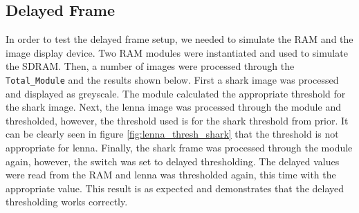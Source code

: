\documentclass[12pt]{article}
\begin{document}
  \subsection{Delayed Frame}
  In order to test the delayed frame setup, we needed to simulate the RAM and the image display device. Two RAM modules were instantiated and used to simulate the SDRAM. Then, a number of images were processed through the \texttt{Total\_Module} and the results shown below. First a shark image was processed and displayed as greyscale. The module calculated the appropriate threshold for the shark image. Next, the lenna image was processed through the module and thresholded, however, the threshold used is for the shark threshold from prior. It can be clearly seen in figure \ref{fig:lenna_thresh_shark} that the threshold is not appropriate for lenna. Finally, the shark frame was processed through the module again, however, the switch was set to delayed thresholding. The delayed values were read from the RAM and lenna was thresholded again, this time with the appropriate value. This result is as expected and demonstrates that the delayed thresholding works correctly.
\end{document}

